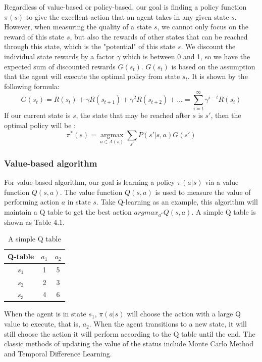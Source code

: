 Regardless of value-based or policy-based, our goal is finding a policy function $\pi (s)$ to give the excellent action that an agent takes in any given state $s$. However, when measuring the quality of a state $s$, we cannot only focus on the reward of this state $s$, but also the rewards of other states that can be reached through this state, which is the "potential" of this state $s$. We discount the individual state rewards by a factor $\gamma$ which is between 0 and 1, so we have the expected sum of discounted rewards $G(s_t)$. $G(s_t)$ is based on the assumption that the agent will execute the optimal policy from state $s_t$. It is shown by the following formula:
$$
G(s_t)
= R(s_t)+\gamma R(s_{t+1})+\gamma ^2R(s_{t+2})+...  
= \sum_{i=t}^\infty \gamma^{i-t}R(s_i) 
$$
If our current state is $s$, the state that may be reached after $s$ is $s'$, then the optimal policy will be :
$$
\pi^*(s)=\mathop{argmax}\limits_{a\in A(s)} \sum_{s'}P(s'|s,a)G(s')
$$


\subsubsection{Value-based algorithm}

For value-based algorithm, our goal is learning a policy $\pi(a|s)$ via a value function $Q(s,a)$. The value function $Q(s,a)$ is used to measure the value of performing action $a$ in state $s$. Take Q-learning as an example, this algorithm will maintain a Q table to get the best action $argmax_{a^*}Q(s,a)$. A simple Q table is shown as Table 4.1.
\begin{table}[h]
    \centering
    \caption{A simple Q table}\label{tab:aStrangeTable}
    \begin{tabular}{|c|c|c|}
        \hline
        Q-table & $a_1$ & $a_2$ \\
        \hline
        $s_1$ & 1 & 5 \\
        \hline
        $s_2$ & 2 & 3 \\
        \hline
        $s_3$ & 4 & 6 \\
        \hline
    \end{tabular}
\end{table}

When the agent is in state $s_1$, $\pi(a|s)$ will choose the action with a large Q value to execute, that is, $a_2$. When the agent transitions to a new state, it will still choose the action it will perform according to the Q table until the end. The classic methods of updating the value of the status include Monte Carlo Method and Temporal Difference Learning.

